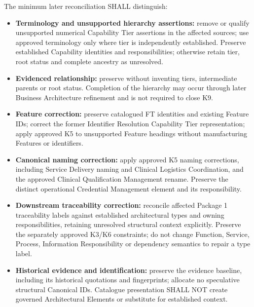 The minimum later reconciliation SHALL distinguish:

\label{rad:k9:1473}

\begin{itemize}

\item 
\textbf{Terminology and unsupported hierarchy assertions:} remove or qualify unsupported numerical Capability Tier assertions in the affected sources; use approved terminology only where tier is independently established. Preserve established Capability identities and responsibilities; otherwise retain tier, root status and complete ancestry as unresolved.



\item 
\textbf{Evidenced relationship:} preserve \texttt{} without inventing tiers, intermediate parents or root status. Completion of the hierarchy may occur through later Business Architecture refinement and is not required to close K9.



\item 
\textbf{Feature correction:} preserve catalogued FT identities and existing Feature IDs; correct the former Identifier Resolution Capability Tier representation; apply approved K5 to unsupported Feature headings without manufacturing Features or identifiers.



\item 
\textbf{Canonical naming correction:} apply approved K5 naming corrections, including Service Delivery naming and Clinical Logistics Coordination, and the approved Clinical Qualification Management rename. Preserve the distinct operational Credential Management element and its responsibility.



\item 
\textbf{Downstream traceability correction:} reconcile affected Package 1 traceability labels against established architectural types and owning responsibilities, retaining unresolved structural context explicitly. Preserve the separately approved K3/\allowbreak{}K6 constraints; do not change Function, Service, Process, Information Responsibility or dependency semantics to repair a type label.



\item 
\textbf{Historical evidence and identification:} preserve the evidence baseline, including its historical quotations and fingerprints; allocate no speculative structural Canonical IDs. Catalogue presentation SHALL NOT create governed Architectural Elements or substitute for established context.



\end{itemize}
\label{rad:k9:1480}


